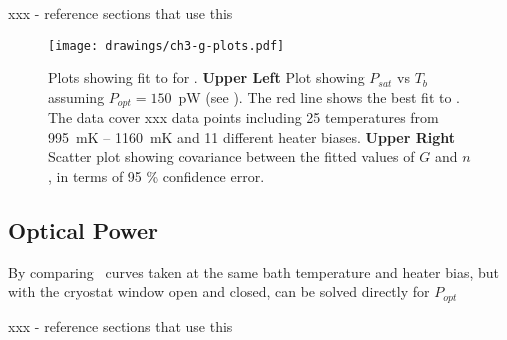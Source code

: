 xxx - reference sections that use this

\begin{figure*}
\texttt{[image: drawings/ch3-g-plots.pdf]}
\caption{Plots showing fit to  for .
\textbf{Upper Left} Plot showing $P_{sat}$ vs $T_b$ assuming $P_{opt} = 150$~pW (see ).
The red line shows the best fit to .
The data cover xxx data points including 25 temperatures from 995~mK -- 1160~mK and 11 different heater biases.
\textbf{Upper Right} Scatter plot showing covariance between the fitted values of $G$ and $n$, in terms of 95 \% confidence error.} 
\label{fig:ch3-g-plots}
\end{figure*}

\subsection{Optical Power}

By comparing \IV\ curves taken at the same bath temperature and heater bias, but with the cryostat window open and closed,  can be solved directly for $P_{opt}$

xxx - reference sections that use this
